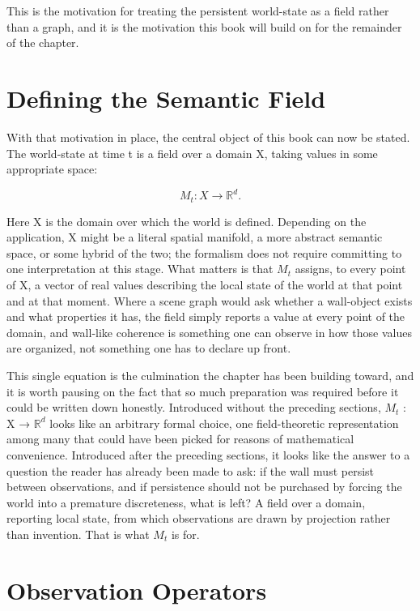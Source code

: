 This is the motivation for treating the persistent world-state as a field rather than a graph, and it is the motivation this book will build on for the remainder of the chapter.

\section{Defining the Semantic Field}

With that motivation in place, the central object of this book can now be stated. The world-state at time t is a field over a domain X, taking values in some appropriate space:

\[ M_t : X \to \mathbb{R}^d. \]

Here X is the domain over which the world is defined. Depending on the application, X might be a literal spatial manifold, a more abstract semantic space, or some hybrid of the two; the formalism does not require committing to one interpretation at this stage. What matters is that \(M_t\) assigns, to every point of X, a vector of real values describing the local state of the world at that point and at that moment. Where a scene graph would ask whether a wall-object exists and what properties it has, the field simply reports a value at every point of the domain, and wall-like coherence is something one can observe in how those values are organized, not something one has to declare up front.

This single equation is the culmination the chapter has been building toward, and it is worth pausing on the fact that so much preparation was required before it could be written down honestly. Introduced without the preceding sections, \(M_t\) : X → \(\mathbb{R}^d\) looks like an arbitrary formal choice, one field-theoretic representation among many that could have been picked for reasons of mathematical convenience. Introduced after the preceding sections, it looks like the answer to a question the reader has already been made to ask: if the wall must persist between observations, and if persistence should not be purchased by forcing the world into a premature discreteness, what is left? A field over a domain, reporting local state, from which observations are drawn by projection rather than invention. That is what \(M_t\) is for.

\section{Observation Operators}

